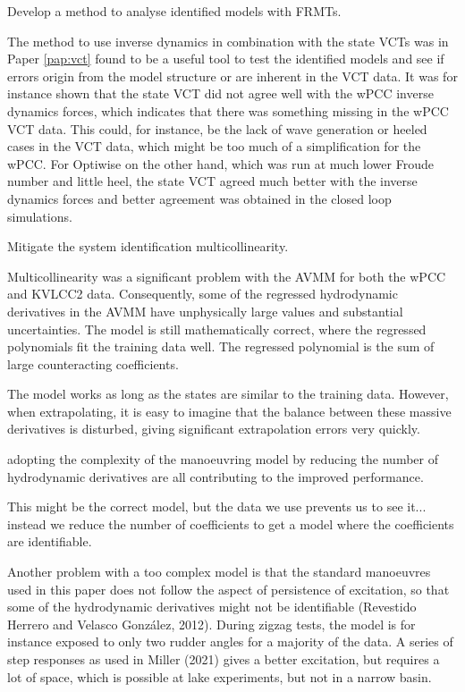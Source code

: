 \begin{tcolorbox}[sharp corners,title=RO3]
Develop a method to analyse identified models with FRMTs.
\end{tcolorbox}
The method to use inverse dynamics in combination with the state VCTs was in Paper \ref{pap:vct} found to be a useful tool to test the identified models and see if errors origin from the model structure or are inherent in the VCT data. It was for instance shown that the state VCT did not agree well with the wPCC inverse dynamics forces, which indicates that there was something missing in the wPCC VCT data. This could, for instance, be the lack of wave generation or heeled cases in the VCT data, which might be too much of a simplification for the wPCC. For Optiwise on the other hand, which was run at much lower Froude number and little heel, the state VCT agreed much better with the inverse dynamics forces and better agreement was obtained in the closed loop simulations.

\begin{tcolorbox}[sharp corners,title=RO4]
Mitigate the system identification multicollinearity.
\end{tcolorbox}
Multicollinearity was a significant problem with the AVMM for both the wPCC and KVLCC2 data. Consequently, some of the regressed hydrodynamic derivatives in the AVMM have unphysically large values and substantial uncertainties. The model is still mathematically correct, where the regressed polynomials fit the training data well. The regressed polynomial is the sum of large counteracting coefficients.

The model works as long as the states are similar to the training data. However, when extrapolating, it is easy to imagine that the balance between these massive derivatives is disturbed, giving significant extrapolation errors very quickly.

adopting the complexity of the manoeuvring model by reducing the number of hydrodynamic derivatives are all contributing to the improved performance.

This might be the correct model, but the data we use prevents us to see it... instead we reduce the number of coefficients to get a model where the coefficients are identifiable.

Another problem with a too complex model is that the standard manoeuvres used in this paper does not follow the aspect of persistence of excitation, so that some of the hydrodynamic derivatives might not be identifiable (Revestido Herrero and Velasco González, 2012). During zigzag tests, the model is for instance exposed to only two rudder angles for a majority of the data. A series of step responses as used in Miller (2021) gives a better excitation, but requires a lot of space, which is possible at lake experiments, but not in a narrow basin.

